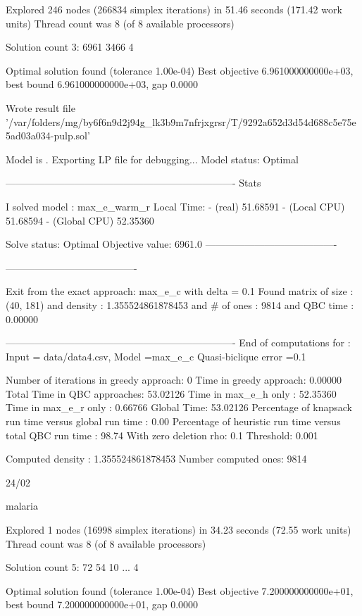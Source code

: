 Explored 246 nodes (266834 simplex iterations) in 51.46 seconds (171.42 work units)
Thread count was 8 (of 8 available processors)

Solution count 3: 6961 3466 4 

Optimal solution found (tolerance 1.00e-04)
Best objective 6.961000000000e+03, best bound 6.961000000000e+03, gap 0.0000%

Wrote result file '/var/folders/mg/by6f6n9d2j94g_lk3b9m7nfrjxgrsr/T/9292a652d3d54d688c5e75e5ad03a034-pulp.sol'

Model is . Exporting LP file for debugging...
Model status: Optimal

----------------------------------------------------------------------
Stats

 I solved model : max_e_warm_r  Local Time:  - (real) 51.68591 - (Local CPU) 51.68594 - (Global CPU) 52.35360

Solve status: Optimal Objective value: 6961.0
----------------------------------------

----------------------------------------

        Exit from the exact approach: max_e_c
        with delta =  0.1
        Found matrix of size : (40, 181)
        and density : 1.355524861878453
        and # of ones : 9814
        and QBC time  : 0.00000
        

----------------------------------------------------------------------
 End of computations for :    Input = data/data4.csv,   Model =max_e_c  Quasi-biclique error  =0.1

    Number of iterations in greedy approach: 0
    Time in greedy approach: 0.00000
    Total Time in QBC approaches: 53.02126
    Time in max_e_h only : 52.35360
    Time in max_e_r only : 0.66766
    Global Time: 53.02126
    Percentage of knapsack run time versus global run time : 0.00%
    Percentage of heuristic run time versus total QBC run time : 98.74%
    With zero deletion rho: 0.1
    Threshold: 0.001
    
 Computed density :  1.355524861878453  Number computed ones: 9814
 
 
 24/02 
 
 malaria 
 
Explored 1 nodes (16998 simplex iterations) in 34.23 seconds (72.55 work units)
Thread count was 8 (of 8 available processors)

Solution count 5: 72 54 10 ... 4

Optimal solution found (tolerance 1.00e-04)
Best objective 7.200000000000e+01, best bound 7.200000000000e+01, gap 0.0000%

